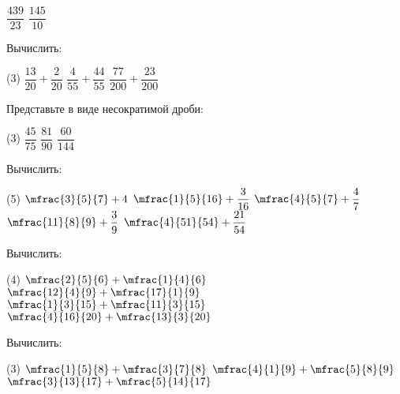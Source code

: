 \begin{class}[number=1]
\begin{listofex}
\begin{tasks}
			\task \( \dfrac{439}{23} \)
			\task \( \dfrac{145}{10} \)
		\end{tasks}
		\item Вычислить:
		\begin{tasks}(3)
			\task \( \dfrac{13}{20}+\dfrac{2}{20} \)
			\task \( \dfrac{4}{55}+\dfrac{44}{55} \)
			\task \( \dfrac{77}{200}+\dfrac{23}{200} \)
		\end{tasks}
		\item Представьте в виде несократимой дроби:
		\begin{tasks}(3)
			\task \( \dfrac{45}{75} \)
			\task \( \dfrac{81}{90} \)
			\task \( \dfrac{60}{144} \)
		\end{tasks}
		\item Вычислить:
		\begin{tasks}(5)
			\task \( \mfrac{3}{5}{7}+4 \)
			\task \( \mfrac{1}{5}{16}+\dfrac{3}{16} \)
			\task \( \mfrac{4}{5}{7}+\dfrac{4}{7} \)
			\task \( \mfrac{11}{8}{9}+\dfrac{3}{9} \)
			\task \( \mfrac{4}{51}{54}+\dfrac{21}{54} \)
		\end{tasks}
		\item Вычислить:
		\begin{tasks}(4)
			\task \( \mfrac{2}{5}{6}+\mfrac{1}{4}{6} \)
			\task \( \mfrac{12}{4}{9}+\mfrac{17}{1}{9} \)
			\task \( \mfrac{1}{3}{15}+\mfrac{11}{3}{15} \)
			\task \( \mfrac{4}{16}{20}+\mfrac{13}{3}{20} \)
		\end{tasks}
		\item Вычислить:
		\begin{tasks}(3)
			\task \( \mfrac{1}{5}{8}+\mfrac{3}{7}{8} \)
			\task \( \mfrac{4}{1}{9}+\mfrac{5}{8}{9} \)
			\task \( \mfrac{3}{13}{17}+\mfrac{5}{14}{17} \)
		\end{tasks}
	\end{listofex}
\end{class}
%
%
%
